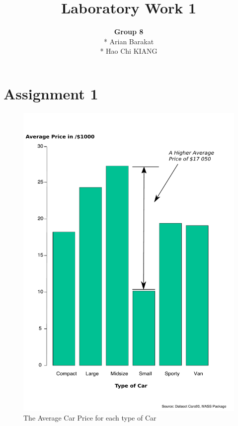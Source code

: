 \documentclass[11pt]{article}
\begin{document}
\author{\textbf{Group 8} \\* Arian Barakat \\* Hao Chi KIANG}

\title{Laboratory Work 1}
\maketitle

\section*{Assignment 1}

\begin{figure}[H]
  \centering
   \includegraphics[scale=0.4]{Assignment_1.pdf}
   \caption{The Average Car Price for each type of Car}
\end{figure}
\end{document}
